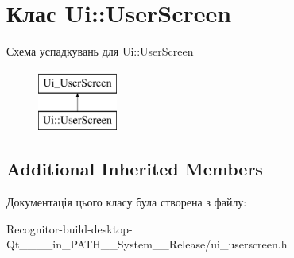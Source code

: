 \hypertarget{classUi_1_1UserScreen}{\section{Клас Ui\-:\-:User\-Screen}
\label{classUi_1_1UserScreen}
}
Схема успадкувань для Ui\-:\-:User\-Screen\begin{figure}[H]
\begin{center}
\leavevmode
\includegraphics[height=2.000000cm]{classUi_1_1UserScreen}
\end{center}
\end{figure}
\subsection*{Additional Inherited Members}


Документація цього класу була створена з файлу\-:\begin{DoxyCompactItemize}
\item 
Recognitor-\/build-\/desktop-\/\-Qt\-\_\-\_\-\_\-\_\-in\-\_\-\-P\-A\-T\-H\-\_\-\-\_\-\-System\-\_\-\-\_\-\-Release/ui\-\_\-userscreen.\-h\end{DoxyCompactItemize}
